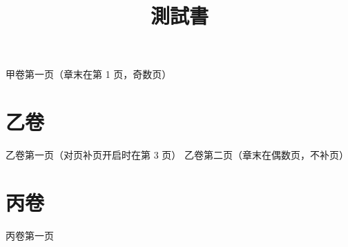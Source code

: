 \documentclass{ltc-guji}
\title{測試書}
\begin{document}
\begin{正文}
甲卷第一页（章末在第 1 页，奇数页）
\clearpage
\chapter{乙卷}
乙卷第一页（对页补页开启时在第 3 页）
\clearpage
乙卷第二页（章末在偶数页，不补页）
\clearpage
\chapter{丙卷}
丙卷第一页
\end{正文}
\end{document}

